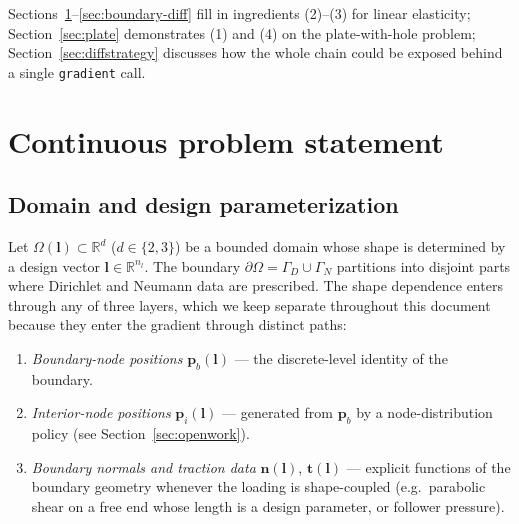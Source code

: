 \documentclass[11pt,a4paper]{article}
\newcommand{\vect}[1]{\boldsymbol{#1}}
\newcommand{\pts}{\vect{p}}
\newcommand{\reals}{\mathbb{R}}
\begin{document}
Sections~\ref{sec:problem}--\ref{sec:boundary-diff} fill in ingredients (2)--(3) for
linear elasticity; Section~\ref{sec:plate} demonstrates (1) and (4) on the
plate-with-hole problem; Section~\ref{sec:diffstrategy} discusses how the whole
chain could be exposed behind a single \texttt{gradient} call.

\section{Continuous problem statement}
\label{sec:problem}

\subsection{Domain and design parameterization}

Let $\Omega(\vect l) \subset \reals^d$ ($d \in \{2,3\}$) be a bounded
domain whose shape is determined by a design vector
$\vect l \in \reals^{n_l}$. The boundary
$\partial\Omega = \Gamma_D \cup \Gamma_N$ partitions into disjoint
parts where Dirichlet and Neumann data are prescribed. The shape
dependence enters through any of three layers, which we keep separate
throughout this document because they enter the gradient through
distinct paths:

\begin{enumerate}[label=(\roman*)]
  \item \emph{Boundary-node positions} $\pts_b(\vect l)$ --- the
        discrete-level identity of the boundary.
  \item \emph{Interior-node positions} $\pts_i(\vect l)$ --- generated
        from $\pts_b$ by a node-distribution policy (see
        Section~\ref{sec:openwork}).
  \item \emph{Boundary normals and traction data}
        $\vect n(\vect l)$, $\vect t(\vect l)$ --- explicit functions
        of the boundary geometry whenever the loading is
        shape-coupled (e.g.\ parabolic shear on a free end whose
        length is a design parameter, or follower pressure).
\end{enumerate}
\end{document}
